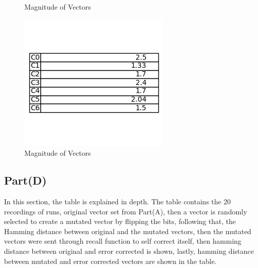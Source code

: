 \documentclass[12pt]{article}
\begin{document}
\begin{figure}[ht]
\begin{minipage}{0.33\textwidth}
        \vspace{-2cm}
        \caption{Magnitude of Vectors}
        \label{fig:crosstalk}
    \end{minipage}\hfill
    \begin{minipage}{0.33\textwidth}
        \centering
        \includegraphics[width=\linewidth]{magnitude3.png}
        \vspace{-2cm}
        \caption{Magnitude of Vectors}
        \label{fig:magnitude}
    \end{minipage}
\end{figure}

\newpage
\clearpage %

\subsection{Part(D)}

In this section, the table is explained in depth. The table contains the 20 recordings of runs, original vector set from Part(A), then a vector is randomly selected to create a mutated vector by flipping the bits, following that, the Hamming distance between original and the mutated vectors, then the mutated vectors were sent through recall function to self correct itself, then hamming distance between original and error corrected is shown, lastly, hamming distance between mutated and error corrected vectors are shown in the table.
\end{document}
